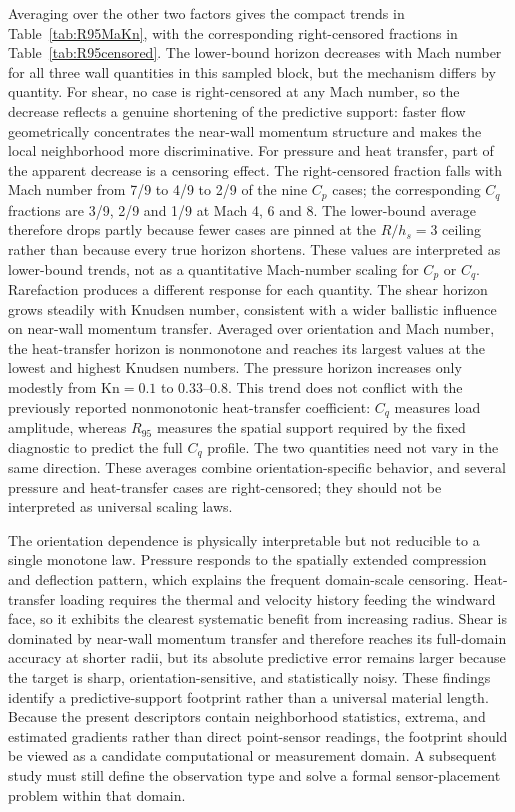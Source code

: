 \documentclass[aip,pof,preprint,notitlepage,floatfix,amsmath,amssymb]{revtex4-2}
\newcommand{\Kn}{\mathrm{Kn}}
\begin{document}
Averaging over the other two factors gives the compact trends in Table~\ref{tab:R95MaKn}, with the corresponding right-censored fractions in Table~\ref{tab:R95censored}. The lower-bound horizon decreases with Mach number for all three wall quantities in this sampled block, but the mechanism differs by quantity. For shear, no case is right-censored at any Mach number, so the decrease reflects a genuine shortening of the predictive support: faster flow geometrically concentrates the near-wall momentum structure and makes the local neighborhood more discriminative. For pressure and heat transfer, part of the apparent decrease is a censoring effect. The right-censored fraction falls with Mach number from 7/9 to 4/9 to 2/9 of the nine $C_p$ cases; the corresponding $C_q$ fractions are 3/9, 2/9 and 1/9 at Mach 4, 6 and 8. The lower-bound average therefore drops partly because fewer cases are pinned at the $R/h_s=3$ ceiling rather than because every true horizon shortens. These values are interpreted as lower-bound trends, not as a quantitative Mach-number scaling for $C_p$ or $C_q$. Rarefaction produces a different response for each quantity. The shear horizon grows steadily with Knudsen number, consistent with a wider ballistic influence on near-wall momentum transfer. Averaged over orientation and Mach number, the heat-transfer horizon is nonmonotone and reaches its largest values at the lowest and highest Knudsen numbers. The pressure horizon increases only modestly from $\Kn=0.1$ to 0.33--0.8. This trend does not conflict with the previously reported nonmonotonic heat-transfer coefficient: $C_q$ measures load amplitude, whereas $R_{95}$ measures the spatial support required by the fixed diagnostic to predict the full $C_q$ profile. The two quantities need not vary in the same direction. These averages combine orientation-specific behavior, and several pressure and heat-transfer cases are right-censored; they should not be interpreted as universal scaling laws.

The orientation dependence is physically interpretable but not reducible to a single monotone law. Pressure responds to the spatially extended compression and deflection pattern, which explains the frequent domain-scale censoring. Heat-transfer loading requires the thermal and velocity history feeding the windward face, so it exhibits the clearest systematic benefit from increasing radius. Shear is dominated by near-wall momentum transfer and therefore reaches its full-domain accuracy at shorter radii, but its absolute predictive error remains larger because the target is sharp, orientation-sensitive, and statistically noisy. These findings identify a predictive-support footprint rather than a universal material length. Because the present descriptors contain neighborhood statistics, extrema, and estimated gradients rather than direct point-sensor readings, the footprint should be viewed as a candidate computational or measurement domain. A subsequent study must still define the observation type and solve a formal sensor-placement problem within that domain.
\end{document}
